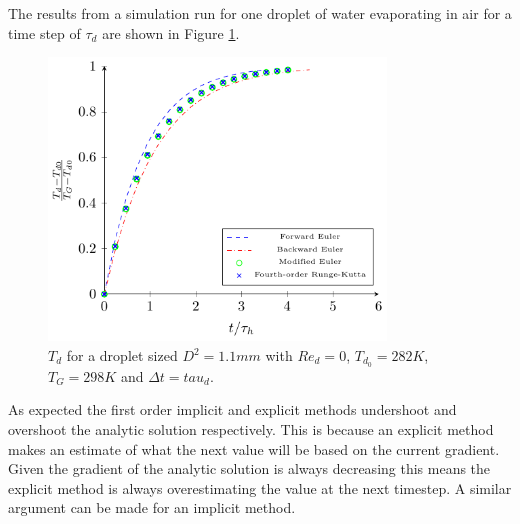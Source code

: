 \documentclass[../Interim_Report_Master]{subfiles}
\begin{document}
The results from a simulation run for one droplet of water evaporating in air for a time step of $\tau_d$ are shown in Figure \ref{temp_time_tau}. 
\begin{figure}[h]
	\centering
	\includegraphics[width=0.8\textwidth]{./Diagrams/Uncoupled_Heat_Transfer_tau/Uncoupled_Heat_Transfer_tau.pdf}
	\caption{$T_d$ for a droplet sized $D^2=1.1mm$ with $Re_d=0$, $T_{d_0}=282K$, $T_G=298K$ and $\Delta t=tau_d$.}
	\label{temp_time_tau}
\end{figure}

As expected the first order implicit and explicit methods undershoot and overshoot the analytic solution respectively. This is because an explicit method makes an estimate of what the next value will be based on the current gradient. Given the gradient of the analytic solution is always decreasing this means the explicit method is always overestimating the value at the next timestep. A similar argument can be made for an implicit method.
\end{document}
